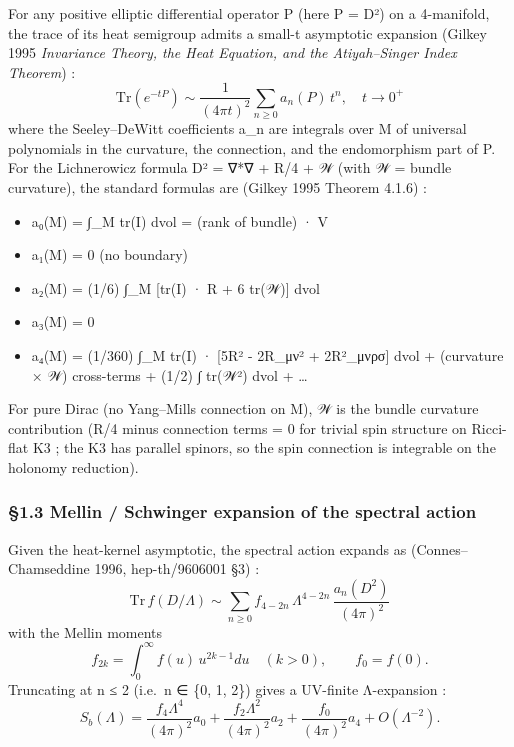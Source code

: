\documentclass[
  11pt,
  a4paper,
]{article}
\providecommand{\tightlist}{\setlength{\itemsep}{0pt}\setlength{\parskip}{0pt}}
\providecommand{\tightlist}{%
  \setlength{\itemsep}{0pt}\setlength{\parskip}{0pt}}
\begin{document}
For any positive elliptic differential operator P (here P = D²) on a 4-manifold, the trace of its heat semigroup admits a small-t asymptotic expansion (Gilkey 1995 \emph{Invariance Theory, the Heat Equation, and the Atiyah--Singer Index Theorem}) :
\[
\mathrm{Tr}(e^{-tP}) \sim \frac{1}{(4\pi t)^{2}} \sum_{n\geq 0} a_n(P) \, t^{n}, \quad t \to 0^{+}
\]
where the Seeley--DeWitt coefficients a\_n are integrals over M of universal polynomials in the curvature, the connection, and the endomorphism part of P. For the Lichnerowicz formula D² = ∇*∇ + R/4 + 𝒲 (with 𝒲 = bundle curvature), the standard formulas are (Gilkey 1995 Theorem 4.1.6) :

\begin{itemize}
\tightlist
\item
  a₀(M) = ∫\_M tr(I) dvol = (rank of bundle) · V
\item
  a₁(M) = 0 (no boundary)
\item
  a₂(M) = (1/6) ∫\_M {[}tr(I) · R + 6 tr(𝒲){]} dvol
\item
  a₃(M) = 0
\item
  a₄(M) = (1/360) ∫\_M tr(I) · {[}5R² - 2R\_μν² + 2R²\_μνρσ{]} dvol + (curvature × 𝒲) cross-terms + (1/2) ∫ tr(𝒲²) dvol + \ldots{}
\end{itemize}

For pure Dirac (no Yang--Mills connection on M), 𝒲 is the bundle curvature contribution (R/4 minus connection terms = 0 for trivial spin structure on Ricci-flat K3 ; the K3 has parallel spinors, so the spin connection is integrable on the holonomy reduction).

\hypertarget{mellin-schwinger-expansion-of-the-spectral-action}{%
\subsubsection{§1.3 Mellin / Schwinger expansion of the spectral action}\label{mellin-schwinger-expansion-of-the-spectral-action}}

Given the heat-kernel asymptotic, the spectral action expands as (Connes--Chamseddine 1996, hep-th/9606001 §3) :
\[
\mathrm{Tr}\, f(D/\Lambda) \sim \sum_{n\geq 0} f_{4-2n} \, \Lambda^{4-2n} \, \frac{a_n(D^2)}{(4\pi)^{2}}
\]
with the Mellin moments
\[
f_{2k} = \int_{0}^{\infty} f(u) \, u^{2k-1} du \quad (k > 0), \qquad f_0 = f(0).
\]
Truncating at n ≤ 2 (i.e.~n ∈ \{0, 1, 2\}) gives a UV-finite Λ-expansion :
\[
S_b(\Lambda) = \frac{f_4 \Lambda^4}{(4\pi)^2} a_0 + \frac{f_2 \Lambda^2}{(4\pi)^2} a_2 + \frac{f_0}{(4\pi)^2} a_4 + O(\Lambda^{-2}).
\]
\end{document}
